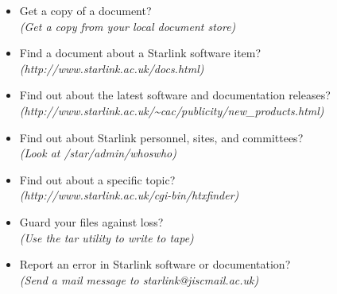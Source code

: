 \documentclass[twoside]{article}
\newcommand{\htmladdnormallink}[2]{#1}
\begin{document}
\begin{itemize}
\hspace*{10mm} {\em (Ask your Site Manager, or look in your Local Guide)}
\item Get a copy of a document?\\
\hspace*{10mm} {\em (Get a copy from your local document store)}
\item Find a document about a Starlink software item?\\
\hspace*{10mm} {\em (\htmladdnormallink{http://www.starlink.ac.uk/docs.html}
{http://www.starlink.ac.uk/docs.html})}
\item Find out about the latest software and documentation releases?\\
\hspace*{10mm}
{\em (http://www.starlink.ac.uk/\~{}cac/publicity/new\_products.html)}
\item Find out about Starlink personnel, sites, and committees?\\
\hspace*{10mm} {\em (Look at /star/\-admin/\-whoswho)}
\item Find out about a specific topic?\\
\hspace*{10mm} {\em (\htmladdnormallink{http://www.starlink.ac.uk/cgi-bin/htxfinder}
{http://www.starlink.ac.uk/cgi-bin/htxfinder})}
\item Guard your files against loss?\\
\hspace*{10mm} {\em (Use the tar utility to write to tape)}
\item Report an error in Starlink software or documentation?\\
\hspace*{10mm} {\em (Send a mail message to starlink@jiscmail.ac.uk)}
\end{itemize}
\end{document}
